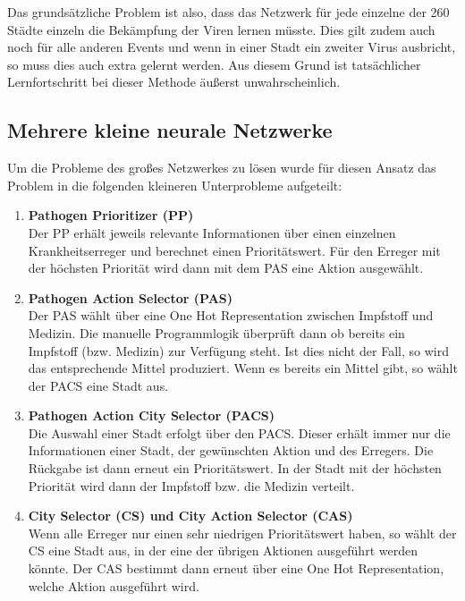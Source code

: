 \documentclass[11pt, twocolumn]{article}
\begin{document}
Das grundsätzliche Problem ist also, dass das Netzwerk für jede einzelne der 260 Städte einzeln die Bekämpfung der Viren lernen müsste. Dies gilt zudem auch noch für alle anderen Events und wenn in einer Stadt ein zweiter Virus ausbricht, so muss dies auch extra gelernt werden. Aus diesem Grund ist tatsächlicher Lernfortschritt bei dieser Methode äußerst unwahrscheinlich.



\subsection{Mehrere kleine neurale Netzwerke}
Um die Probleme des großes Netzwerkes zu lösen wurde für diesen Ansatz das Problem in die folgenden kleineren Unterprobleme aufgeteilt:

\begin{enumerate}
	\item \textbf{Pathogen Prioritizer (PP)} \\
		Der PP erhält jeweils relevante Informationen über einen einzelnen Krankheitserreger und berechnet einen Prioritätswert. Für den Erreger mit der höchsten Priorität wird dann mit dem PAS eine Aktion ausgewählt.
	\item \textbf{Pathogen Action Selector (PAS)}\\
		Der PAS wählt über eine One Hot Representation zwischen Impfstoff und Medizin. Die manuelle Programmlogik überprüft dann ob bereits ein Impfstoff (bzw. Medizin) zur Verfügung steht. Ist dies nicht der Fall, so wird das entsprechende Mittel produziert. Wenn es bereits ein Mittel gibt, so wählt der PACS eine Stadt aus.
	\item \textbf{Pathogen Action City Selector (PACS)} \\
		Die Auswahl einer Stadt erfolgt über den PACS. Dieser erhält immer nur die Informationen einer Stadt, der gewünschten Aktion und des Erregers. Die Rückgabe ist dann erneut ein Prioritätswert. In der Stadt mit der höchsten Priorität wird dann der Impfstoff bzw. die Medizin verteilt.
	\item \textbf{City Selector (CS) und City Action Selector (CAS)}\\
		Wenn alle Erreger nur einen sehr niedrigen Prioritätswert haben, so wählt der CS eine Stadt aus, in der eine der übrigen Aktionen ausgeführt werden könnte. Der CAS bestimmt dann erneut über eine One Hot Representation, welche Aktion ausgeführt wird.
\end{enumerate}
\end{document}
